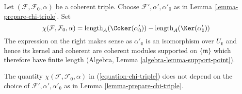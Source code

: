 \noindent
Let $(\mathcal{F}, \mathcal{F}_0, \alpha)$ be a coherent triple.
Choose $\mathcal{F}', \alpha', \alpha'_0$ as in
Lemma \ref{lemma-prepare-chi-triple}. Set
\begin{equation}
\label{equation-chi-triple}
\chi(\mathcal{F}, \mathcal{F}_0, \alpha) =
\text{length}_A(\Coker(\alpha'_0)) - 
\text{length}_A(\Ker(\alpha'_0))
\end{equation}
The expression on the right makes sense as $\alpha'_0$ is an isomorphism
over $U_0$ and hence its kernel and coherent are coherent modules supported
on $\{\mathfrak m\}$ which therefore have finite length
(Algebra, Lemma \ref{algebra-lemma-support-point}).

\begin{lemma}
\label{lemma-well-defined-chi-triple}
The quantity $\chi(\mathcal{F}, \mathcal{F}_0, \alpha)$ in
(\ref{equation-chi-triple}) does not depend on the choice of
$\mathcal{F}', \alpha', \alpha'_0$ as in Lemma \ref{lemma-prepare-chi-triple}.
\end{lemma}

